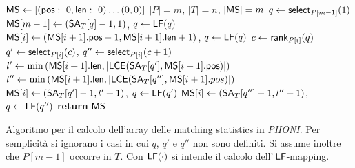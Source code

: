 \begin{algorithm}
  \small
  \begin{algorithmic}[1]
    \State $\mbox{\rm {\sf MS}}\gets [(\mbox{\rm {\sf pos}}:\,\,0,\mbox{\rm {\sf len}}:\,\,0)\ldots (0,0)]$
     \Comment $|P|=m$, $|T|=n$, $|\mbox{\rm {\sf MS}}|=m$
    \State $q\gets \mbox{\rm {\sf select}}_{P[m-1]}(1)$
    \State $\mbox{\rm {\sf MS}}[m-1]\gets (\mbox{\rm {\sf SA}}_T[q]-1,1)$, $q\gets \mbox{\rm {\sf LF}}(q)$
    \State $\mbox{\rm {\sf MS}}[i]\gets (\mbox{\rm {\sf MS}}[i+1].\mbox{\rm {\sf pos}}-1,\mbox{\rm {\sf MS}}[i+1].\mbox{\rm {\sf len}}+1)$, $q\gets \mbox{\rm {\sf LF}}(q)$
    \Else
    \State $c\gets \mbox{\rm {\sf rank}}_{P[i]}(q)$
    \State $q'\gets \mbox{\rm {\sf select}}_{P[i]}(c)$, $q''\gets \mbox{\rm {\sf select}}_{P[i]}(c+1)$
    \State $l'\gets \min\left(\mbox{\rm {\sf MS}}[i+1].\mbox{\rm {\sf len}}, \left|\mbox{\rm {\sf LCE}}(\mbox{\rm {\sf SA}}_T[q'],
    \mbox{\rm {\sf MS}}[i+1].\mbox{\rm {\sf pos}})\right|\right)$
    \State $l''\gets \min\left(\mbox{\rm {\sf MS}}[i+1].\mbox{\rm {\sf len}}, \left|\mbox{\rm {\sf LCE}}(\mbox{\rm {\sf SA}}_T[q''],
    \mbox{\rm {\sf MS}}[i+1].pos)\right|\right)$ 
    \EndIf
    \State $\mbox{\rm {\sf MS}}[i]\gets (\mbox{\rm {\sf SA}}_T[q']-1,l'+1)$, $q\gets \mbox{\rm {\sf LF}}(q')$
    \Else
    \State $\mbox{\rm {\sf MS}}[i]\gets (\mbox{\rm {\sf SA}}_T[q'']-1,l''+1)$, $q\gets \mbox{\rm {\sf LF}}(q'')$
    \EndIf
    \EndFor
    \State \textbf{return} $\mbox{\rm {\sf MS}}$
    \EndFunction
  \end{algorithmic}
  \caption{Algoritmo per il calcolo dell'array delle matching statistics in
  \textit{PHONI}. Per 
  semplicità si ignorano i casi in cui $q$, $q'$ e $q''$ non sono definiti. Si
  assume inoltre che $P[m-1]$ occorre in $T$. Con $\mbox{\rm {\sf LF}}(\cdot)$ si intende il
  calcolo dell'$\,\mbox{\rm {\sf LF}}$-mapping.}
  \label{algo:phonims}
\end{algorithm}
